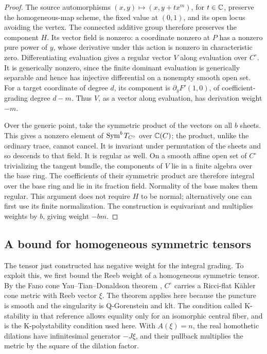 \begin{proof}
The source automorphisms
\((x,y)\mapsto(x,y+t x^m)\), for \(t\in\mathbb C\), preserve the
homogeneous-map scheme, the fixed value at \((0,1)\), and its open
locus avoiding the vertex.  The connected additive group therefore
preserves the component \(H\).  Its vector field is nonzero: a
coordinate nonzero at \(P\) has a nonzero pure power of \(y\), whose
derivative under this action is nonzero in characteristic zero.
Differentiating evaluation gives a regular vector \(V\) along
evaluation over \(C^\circ\).  It is generically nonzero, since the
finite dominant evaluation is generically separable and hence has
injective differential on a nonempty smooth open set.  For a target
coordinate of degree \(d\), its component is
\(\partial_yF'(1,0)\), of coefficient-grading degree \(d-m\).
Thus \(V\), as a vector along evaluation, has derivation weight
\(-m\).

Over the generic point, take the symmetric product of the vectors
on all \(b\) sheets.  This gives a nonzero element of
\(\operatorname{Sym}^bT_{C^\circ}\) over \(\mathbb C(C)\); the product, unlike the
ordinary trace, cannot cancel.  It is invariant under permutation
of the sheets and so descends to that field.  It is regular as
well.  On a smooth affine open set of \(C^\circ\) trivializing the
tangent bundle, the components of \(V\) lie in a finite algebra
over the base ring.  The coefficients of their symmetric product
are therefore integral over the base ring and lie in its fraction
field.  Normality of the base makes them regular.  This argument
does not require \(H\) to be normal; alternatively one can first
use its finite normalization.  The construction is equivariant
and multiplies weights by \(b\), giving weight \(-bm\).
\end{proof}

\subsection{A bound for homogeneous symmetric tensors}

The tensor just constructed has negative weight for the integral grading.
To exploit this, we first bound the Reeb weight of a homogeneous
symmetric tensor.  By the Fano cone
Yau--Tian--Donaldson theorem
\cite[Theorem~1.1 and Definitions~2.1--2.2]{CS19}, \(C^\circ\) carries a
Ricci-flat K\"ahler cone metric with Reeb vector \(\xi\).  The theorem
applies here because the puncture is smooth and the singularity is
Q-Gorenstein and klt.  The condition called K-stability in that reference
allows equality only for an isomorphic central fiber, and is the
K-polystability condition used here.  With \(A(\xi)=n\), the real
homothetic dilations have infinitesimal generator \(-J\xi\), and their
pullback multiplies the metric by the square of the dilation factor.

